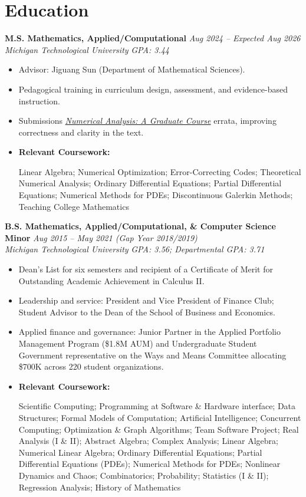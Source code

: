 \documentclass[10pt,letterpaper]{article}
\newcommand{\resumeItem}[1]{\item \small #1}
\newcommand{\resumeLink}[2]{\href{#1}{#2}}
\newcommand{\resumeSubheading}[4]{%
  \textbf{#1} \hfill \small{\textit{#2}}\\
  \small{\textit{#3}} \hfill \small{\textit{#4}}\par
}
\newenvironment{courselist}[1][Relevant Coursework]{%
  \begin{minipage}[t]{\linewidth}%
    \textbf{#1:} \ignorespaces
}{%
  \end{minipage}%
}
\begin{document}
\section*{Education}
\resumeSubheading{M.S. Mathematics, Applied/Computational}{Aug 2024 -- Expected Aug 2026}{Michigan Technological University}{GPA: 3.44}
\begin{itemize}
  \resumeItem{Advisor: Jiguang Sun (Department of Mathematical Sciences).}
  \resumeItem{Pedagogical training in curriculum design, assessment, and evidence-based instruction.}
  \resumeItem{Submissions \resumeLink{https://homepage.divms.uiowa.edu/~dstewart/978-3-031-08120-0_Cover_PrintPDF.pdf}{\emph{Numerical Analysis: A Graduate Course}} errata, improving correctness and clarity in the text.}
  \resumeItem{
  \begin{courselist}
    Linear Algebra; Numerical Optimization; Error-Correcting Codes; Theoretical Numerical Analysis; Ordinary Differential Equations; Partial Differential Equations; Numerical Methods for PDEs; Discontinuous Galerkin Methods; Teaching College Mathematics
  \end{courselist}}
\end{itemize}

\resumeSubheading{B.S. Mathematics, Applied/Computational, \& Computer Science Minor}{Aug 2015 -- May 2021 (Gap Year 2018/2019)}{Michigan Technological University}{GPA: 3.56; Departmental GPA: 3.71}
\begin{itemize}
  \resumeItem{Dean's List for six semesters and recipient of a Certificate of Merit for Outstanding Academic Achievement in Calculus II.}
  \resumeItem{Leadership and service: President and Vice President of Finance Club; Student Advisor to the Dean of the School of Business and Economics.}
  \resumeItem{Applied finance and governance: Junior Partner in the Applied Portfolio Management Program (\$1.8M AUM) and Undergraduate Student Government representative on the Ways and Means Committee allocating \$700K across 220 student organizations.}
  \resumeItem{
  \begin{courselist}
    Scientific Computing; Programming at Software \& Hardware interface; Data Structures; Formal Models of Computation; Artificial Intelligence; Concurrent Computing;
    Optimization \& Graph Algorithms; Team Software Project; Real Analysis (I \& II); Abstract Algebra; Complex Analysis; Linear Algebra; Numerical Linear Algebra;
    Ordinary Differential Equations; Partial Differential Equations (PDEs); Numerical Methods for PDEs; Nonlinear Dynamics and Chaos; Combinatorics; Probability;
    Statistics (I \& II); Regression Analysis; History of Mathematics
  \end{courselist}}
\end{itemize}
\end{document}

